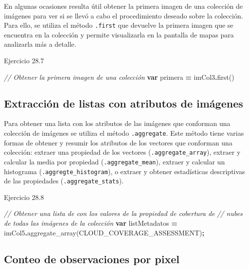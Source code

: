 \documentclass[
  12pt,
  letterpaper,
  twoside]{book}
\newenvironment{Shaded}{\begin{snugshade}}{\end{snugshade}}
\newcommand{\CommentTok}[1]{\textcolor[rgb]{0.56,0.35,0.01}{\textit{#1}}}
\newcommand{\FunctionTok}[1]{\textcolor[rgb]{0.00,0.00,0.00}{#1}}
\newcommand{\KeywordTok}[1]{\textcolor[rgb]{0.13,0.29,0.53}{\textbf{#1}}}
\newcommand{\NormalTok}[1]{#1}
\newcommand{\OperatorTok}[1]{\textcolor[rgb]{0.81,0.36,0.00}{\textbf{#1}}}
\newcommand{\StringTok}[1]{\textcolor[rgb]{0.31,0.60,0.02}{#1}}
\begin{document}
En algunas ocasiones resulta útil obtener la primera imagen de una colección de imágenes para ver si se llevó a cabo el procedimiento deseado sobre la colección. Para ello, se utiliza el método \texttt{.first} que devuelve la primera imagen que se encuentra en la colección y permite visualizarla en la pantalla de mapas para analizarla más a detalle.

Ejercicio 28.7

\begin{Shaded}
\begin{Highlighting}[]
\CommentTok{// Obtener la primera imagen de una colección}
\KeywordTok{var}\NormalTok{ primera }\OperatorTok{=}\NormalTok{ imCol3}\OperatorTok{.}\FunctionTok{first}\NormalTok{()}
\end{Highlighting}
\end{Shaded}

\hypertarget{extracciuxf3n-de-listas-con-atributos-de-imuxe1genes}{%
\subsection{Extracción de listas con atributos de imágenes}\label{extracciuxf3n-de-listas-con-atributos-de-imuxe1genes}}

Para obtener una lista con los atributos de las imágenes que conforman una colección de imágenes se utiliza el método \texttt{.aggregate}. Este método tiene varias formas de obtener y resumir los atributos de los vectores que conforman una colección: extraer una propiedad de los vectores (\texttt{.aggregate\_array}), extraer y calcular la media por propiedad (\texttt{.aggregate\_mean}), extraer y calcular un histograma (\texttt{.aggregte\_histogram}), o extraer y obtener estadísticas descriptivas de las propiedades (\texttt{.aggregate\_stats}).

Ejercicio 28.8

\begin{Shaded}
\begin{Highlighting}[]
\CommentTok{// Obtener una lista de con los valores de la propiedad de cobertura de }
\CommentTok{// nubes de todas las imágenes de la colección}
\KeywordTok{var}\NormalTok{ listMetadatos }\OperatorTok{=}\NormalTok{ imCol5}\OperatorTok{.}\FunctionTok{aggregate\_array}\NormalTok{(}\StringTok{\textquotesingle{}CLOUD\_COVERAGE\_ASSESSMENT\textquotesingle{}}\NormalTok{)}\OperatorTok{;}
\end{Highlighting}
\end{Shaded}

\hypertarget{conteo-de-observaciones-por-pixel}{%
\subsection{Conteo de observaciones por pixel}\label{conteo-de-observaciones-por-pixel}}
\end{document}
